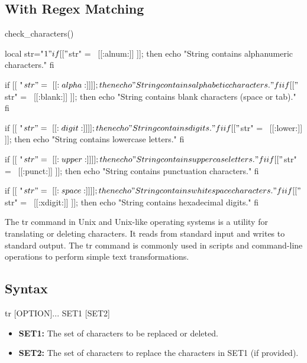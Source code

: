 \documentclass{report}
\begin{document}
\subsection{With Regex Matching}
\bigbreak \noindent 
\begin{bashcode}
    check_characters() {
        local str="$1"

        if [[ "$str" =~ [[:alnum:]] ]]; then
        echo "String contains alphanumeric characters."
        fi

        if [[ "$str" =~ [[:alpha:]] ]]; then
        echo "String contains alphabetic characters."
        fi

        if [[ "$str" =~ [[:blank:]] ]]; then
        echo "String contains blank characters (space or tab)."
        fi

        if [[ "$str" =~ [[:digit:]] ]]; then
        echo "String contains digits."
        fi

        if [[ "$str" =~ [[:lower:]] ]]; then
        echo "String contains lowercase letters."
        fi

        if [[ "$str" =~ [[:upper:]] ]]; then
        echo "String contains uppercase letters."
        fi

        if [[ "$str" =~ [[:punct:]] ]]; then
        echo "String contains punctuation characters."
        fi

        if [[ "$str" =~ [[:space:]] ]]; then
        echo "String contains whitespace characters."
        fi

        if [[ "$str" =~ [[:xdigit:]] ]]; then
        echo "String contains hexadecimal digits."
        fi
    }
\end{bashcode}
\bigbreak \noindent 
{}

\pagebreak 
{}
    \bigbreak \noindent 
    The tr command in Unix and Unix-like operating systems is a utility for translating or deleting characters. It reads from standard input and writes to standard output. The tr command is commonly used in scripts and command-line operations to perform simple text transformations.
    \bigbreak \noindent 
    \subsection{Syntax}
    \bigbreak \noindent 
    \begin{bashcode}
    tr [OPTION]... SET1 [SET2]
    \end{bashcode}
    \bigbreak \noindent 
    \begin{itemize}
        \item \textbf{SET1:} The set of characters to be replaced or deleted.
        \item \textbf{SET2:} The set of characters to replace the characters in SET1 (if provided).
    \end{itemize}
    \bigbreak \noindent 
\end{document}
